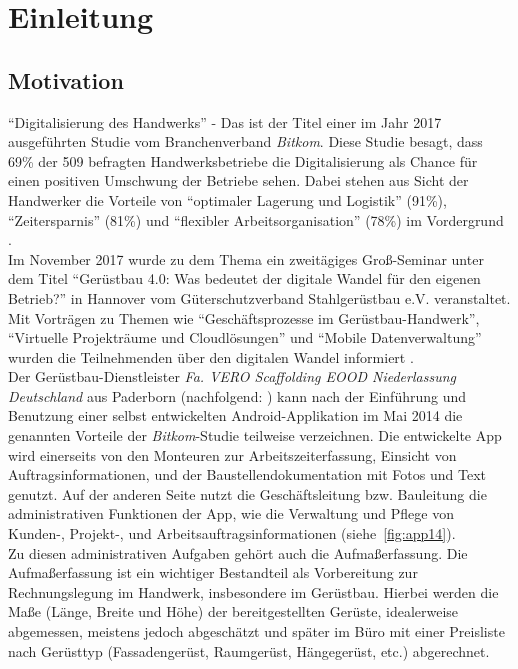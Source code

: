 \chapter{Einleitung}
\section{Motivation}\label{subsec:motivation}
``Digitalisierung des Handwerks'' - Das ist der Titel einer im Jahr 2017 ausgeführten Studie vom Branchenverband \textit{Bitkom}. 
Diese Studie besagt, dass 69\% der 509 befragten Handwerksbetriebe die Digitalisierung als Chance für einen positiven Umschwung der Betriebe sehen. 
Dabei stehen aus Sicht der Handwerker die Vorteile von ``optimaler Lagerung und Logistik'' (91\%), ``Zeitersparnis'' (81\%) und ``flexibler Arbeitsorganisation'' (78\%) im Vordergrund \citep{Bitkom17}. \\

Im November 2017 wurde zu dem Thema ein zweitägiges Groß-Seminar unter dem Titel ``Gerüstbau 4.0: Was bedeutet der digitale Wandel für den eigenen Betrieb?'' in Hannover vom Güterschutzverband Stahlgerüstbau e.V. veranstaltet. 
Mit Vorträgen zu Themen wie ``Geschäftsprozesse im Gerüstbau-Handwerk'', ``Virtuelle Projekträume und Cloudlösungen'' und ``Mobile Datenverwaltung'' wurden die Teilnehmenden über den digitalen Wandel informiert \citep{GSV17}. \\

Der Gerüstbau-Dienstleister \emph{Fa. VERO Scaffolding EOOD Niederlassung Deutschland} aus Paderborn (nachfolgend: \vr{}) kann nach der Einführung und Benutzung einer selbst entwickelten Android-Applikation im Mai 2014 die genannten Vorteile der \textit{Bitkom}-Studie teilweise verzeichnen.
Die entwickelte App wird einerseits von den Monteuren zur Arbeitszeiterfassung, Einsicht von Auftragsinformationen, und der Baustellendokumentation mit Fotos und Text genutzt.
Auf der anderen Seite nutzt die Geschäftsleitung bzw. Bauleitung die administrativen Funktionen der App, wie die Verwaltung und Pflege von Kunden-, Projekt-, und Arbeitsauftragsinformationen (siehe~\autoref{fig:app14}). \\

Zu diesen administrativen Aufgaben gehört auch die Aufmaßerfassung.
Die Aufmaßerfassung ist ein wichtiger Bestandteil als Vorbereitung zur Rechnungslegung im Handwerk, insbesondere im Gerüstbau. 
Hierbei werden die Maße (Länge, Breite und Höhe) der bereitgestellten Gerüste, idealerweise abgemessen, meistens jedoch abgeschätzt und später im Büro mit einer Preisliste nach Gerüsttyp (Fassadengerüst, Raumgerüst, Hängegerüst, etc.) abgerechnet.

